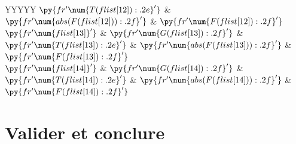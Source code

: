 \documentclass[../main/main.tex]{subfiles}
\begin{document}
{\begin{center}
\begin{tabularx}{\linewidth}{YYYYY}
			$\py{fr'\num{{{T(flist[12]):.2e}}}'}$      &
			$\py{fr'\num{{{abs(F(flist[12])):.2f}}}'}$ &
			$\py{fr'\num{{{F(flist[12]):.2f}}}'}$
			\\
			$\py{fr'\num{{{flist[13]}}}'}$             &
			$\py{fr'\num{{{G(flist[13]):.2f}}}'}$      &
			$\py{fr'\num{{{T(flist[13]):.2e}}}'}$      &
			$\py{fr'\num{{{abs(F(flist[13])):.2f}}}'}$ &
			$\py{fr'\num{{{F(flist[13]):.2f}}}'}$
			\\
			$\py{fr'\num{{{flist[14]}}}'}$             &
			$\py{fr'\num{{{G(flist[14]):.2f}}}'}$      &
			$\py{fr'\num{{{T(flist[14]):.2e}}}'}$      &
			$\py{fr'\num{{{abs(F(flist[14])):.2f}}}'}$ &
			$\py{fr'\num{{{F(flist[14]):.2f}}}'}$
			\\
			\bottomrule
		\end{tabularx}
		\label{tab:ddb_corr}
	\end{center}

}

\section{Valider et conclure}

\end{document}
